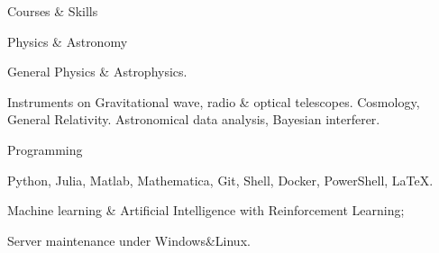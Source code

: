 \documentclass{resume} %
\begin{document}
    



\begin{rSection}{Courses \& Skills}

    \begin{rSubsection}{Physics \& Astronomy}{}{}{}
    \item General Physics \& Astrophysics. 
    \item Instruments on Gravitational wave, radio \& optical telescopes. Cosmology, General Relativity. Astronomical data analysis, Bayesian interferer. 
    \end{rSubsection} 
    
    \begin{rSubsection}{Programming}{}{}{}
    \item Python, Julia, Matlab, Mathematica, Git, Shell, Docker, PowerShell, \LaTeX.
    \item Machine learning \& Artificial Intelligence with Reinforcement Learning; 
    \item Server maintenance under Windows\&Linux.
    \end{rSubsection} 
    
    \end{rSection}
\end{document}
